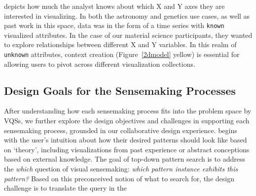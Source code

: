 depicts how much the analyst
knows about which X and Y axes
they are interested in visualizing.
In both the astronomy and genetics use cases,
as well as past work in this space,
data was in the form of a time series
with \texttt{known} visualized attributes.
In the case of our material science participants,
they wanted to explore relationships between different
X and Y variables.
In this realm of \texttt{unknown} attributes,
context creation (Figure~\ref{2dmodel} yellow) is
essential for allowing users
to pivot across different visualization collections.%
\subsection{Design Goals for the Sensemaking Processes}
After understanding how each sensemaking process fits into the problem space  by VQSs, we further explore the design objectives and challenges in supporting each sensemaking process, grounded in our collaborative design experience. %
 begins with the user's intuition
about how their desired patterns should look like based on `theory', including visualizations from past experience or abstract conceptions based on external knowledge. The goal of top-down pattern search is to address the \textit{which} question of visual sensemaking: \textit{which pattern instance exhibits this pattern?} Based on this preconceived notion of what to search for, the design challenge is to translate the query in the
